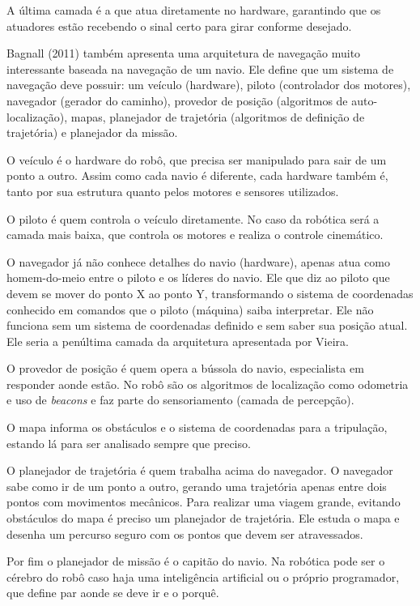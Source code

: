 A última camada é a que atua diretamente no hardware, garantindo que os atuadores estão recebendo o sinal certo para girar conforme desejado.

Bagnall (2011) também apresenta uma arquitetura de navegação muito interessante baseada na navegação de um navio. Ele define que um sistema de navegação deve possuir: um veículo (hardware), piloto (controlador dos motores), navegador (gerador do caminho), provedor de posição (algoritmos de auto-localização), mapas, planejador de trajetória (algoritmos de definição de trajetória)  e planejador da missão.

O veículo é o hardware do robô, que precisa ser manipulado para sair de um ponto a outro. Assim como cada navio é diferente, cada hardware também é, tanto por sua estrutura quanto pelos motores e sensores utilizados.

O piloto é quem controla o veículo diretamente. No caso da robótica será a camada mais baixa, que controla os motores e realiza o controle cinemático.

O navegador já não conhece detalhes do navio (hardware), apenas atua como homem-do-meio entre o piloto e os líderes do navio. Ele que diz ao piloto que devem se mover do ponto X ao ponto Y, transformando o sistema de coordenadas conhecido em comandos que o piloto (máquina) saiba interpretar. Ele não funciona sem um sistema de coordenadas definido e sem saber sua posição atual. Ele seria a penúltima camada da arquitetura apresentada por Vieira.

O provedor de posição é quem opera a bússola do navio, especialista em responder aonde estão. No robô são os algoritmos de localização como odometria e uso de \textit{beacons} e faz parte do sensoriamento (camada de percepção).

O mapa informa os obstáculos e o sistema de coordenadas para a tripulação, estando lá para ser analisado sempre que preciso.

O planejador de trajetória é quem trabalha acima do navegador. O navegador sabe como ir de um ponto a outro, gerando uma trajetória apenas entre dois pontos com movimentos mecânicos. Para realizar uma viagem grande, evitando obstáculos do mapa é preciso um planejador de trajetória. Ele estuda o mapa e desenha um percurso seguro com os pontos que devem ser atravessados.

Por fim o planejador de missão é o capitão do navio. Na robótica pode ser o cérebro do robô caso haja uma inteligência artificial ou o próprio programador, que define par aonde se deve ir e o porquê.

